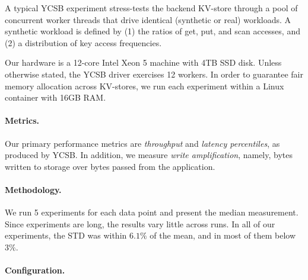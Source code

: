 
A typical YCSB experiment stress-tests the backend KV-store through a pool of concurrent worker threads that drive identical
(synthetic or real) workloads. A synthetic workload is defined by  (1) the ratios of get, put, and scan accesses, and 
(2) a distribution of key access frequencies. 

Our hardware is a 12-core Intel Xeon 5 machine with 4TB SSD disk. Unless otherwise stated, the YCSB driver  
exercises 12 workers. In order to guarantee fair memory allocation across KV-stores, 
we run each experiment within a Linux container with 16GB RAM. 

\paragraph{Metrics.} Our primary performance metrics are \emph{throughput} 
and \emph{latency percentiles}, as produced by YCSB. 
In addition, we measure \emph{write amplification}, namely, bytes written to storage over bytes passed from the application. 

\paragraph{Methodology.} 
We run 5 experiments for each data point and present the median measurement. Since experiments are long, the results vary 
little across runs. In all of our experiments, the STD was within $6.1\%$ of the mean, and in most of them below $3\%$. 


\paragraph{Configuration.} 


